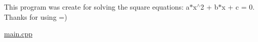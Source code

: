 This program was create for solving the square equations\+: a$\ast$x$^\wedge$2 + b$\ast$x + c = 0. Thanks for using =)
\begin{DoxyItemize}
\item \hyperlink{main_8cpp}{main.\+cpp} 
\end{DoxyItemize}